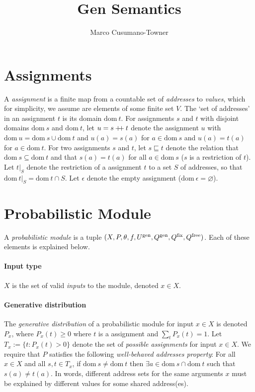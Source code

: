 \documentclass{article}
\title{Gen Semantics}
\author{Marco Cusumano-Towner}
\newcommand\doubleplus{\mathbin{+\mkern-5mu+}}
\newcommand{\concat}[0]{\doubleplus}
\newcommand{\dom}[1]{\mbox{dom}{~#1}}
\newcommand{\emptyassignment}[0]{\epsilon}
\newcommand{\gen}[0]{\mbox{\scriptsize gen}}
\newcommand{\fix}[0]{\mbox{\scriptsize fix}}
\newcommand{\free}[0]{\mbox{\scriptsize free}}
\newcommand{\contained}[0]{\sqsubseteq}
\begin{document}
\maketitle

\section{Assignments}
A \emph{assignment} is a finite map from a countable set of \emph{addresses} to \emph{values}, which for simplicity, we assume are elements of some finite set $V$.
The `set of addresses' in an assignment $t$ is its domain $\dom{t}$.
For assignments $s$ and $t$ with disjoint domains $\dom{s}$ and $\dom{t}$, let $u = s \concat t$ denote the assignment $u$ with $\dom{u} = \dom{s} \cup \dom{t}$ and $u(a) = s(a)$ for $a \in \dom{s}$ and $u(a) = t(a)$ for $a \in \dom{t}$.
For two assignments $s$ and $t$, let $s \contained t$ denote the relation that $\dom{s} \subseteq \dom{t}$ and that $s(a) = t(a)$ for all $a \in \dom{s}$ ($s$ is a restriction of $t$).
Let $t|_S$ denote the restriction of a assignment $t$ to a set $S$ of addresses, so that $\dom{t|_S} = \dom{t} \cap S$.
Let $\emptyassignment$ denote the empty assignment ($\dom \emptyassignment = \varnothing$).

\section{Probabilistic Module}
A \emph{probabilistic module} is a tuple $(X, P, \theta, f, U^{\gen}, Q^{\gen}, Q^{\fix}, Q^{\free})$.
Each of these elements is explained below.

\paragraph{Input type}
$X$ is the set of valid \emph{inputs} to the module, denoted $x \in X$.

\paragraph{Generative distribution}
The \emph{generative distribution} of a probabilistic module for input $x \in X$ is denoted $P_x$, where $P_x(t) \ge 0$ where $t$ is a assignment and $\sum_t P_x(t) = 1$.
Let $T_x := \{t : P_x(t) > 0 \}$ denote the set of \emph{possible assignments} for input $x \in X$.
We require that $P$ satisfies the following \emph{well-behaved addresses property}:
For all $x \in X$ and all $s, t \in T_x$, if $\dom{s} \ne \dom{t}$ then $\exists a \in \dom{s} \cap \dom{t}$ such that $s(a) \ne t(a)$.
In words, different address sets for the same arguments $x$ must be explained by different value{s} for some shared address(es).
\end{document}
